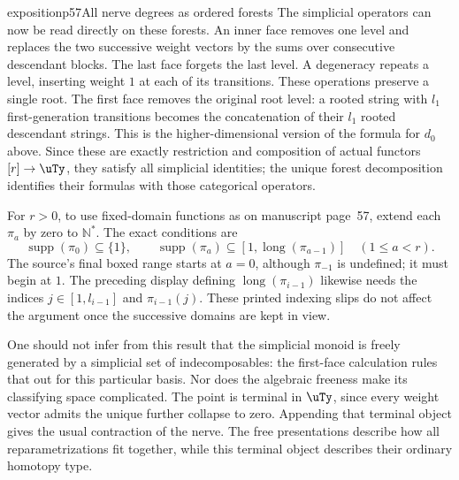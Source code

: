 \begin{dcomment}{exposition}{p57}{All nerve degrees as ordered forests}
The simplicial operators can now be read directly on these forests. An inner face removes one level and replaces the two successive weight vectors by the sums over consecutive descendant blocks. The last face forgets the last level. A degeneracy repeats a level, inserting weight $1$ at each of its transitions. These operations preserve a single root. The first face removes the original root level: a rooted string with $l_1$ first-generation transitions becomes the concatenation of their $l_1$ rooted descendant strings. This is the higher-dimensional version of the formula for $d_0$ above. Since these are exactly restriction and composition of actual functors $[r]\to\uTy$, they satisfy all simplicial identities; the unique forest decomposition identifies their formulas with those categorical operators.

For $r>0$, to use fixed-domain functions as on manuscript page~57, extend each $\pi_a$ by zero to $\mathbb N^*$. The exact conditions are
\[
 \operatorname{supp}(\pi_0)\subseteq\{1\},\qquad
 \operatorname{supp}(\pi_a)\subseteq
       [1,\operatorname{long}(\pi_{a-1})]
       \quad(1\leq a<r).
\]
The source's final boxed range starts at $a=0$, although $\pi_{-1}$ is undefined; it must begin at $1$. The preceding display defining $\operatorname{long}(\pi_{i-1})$ likewise needs the indices $j\in[1,l_{i-1}]$ and $\pi_{i-1}(j)$. These printed indexing slips do not affect the argument once the successive domains are kept in view.

One should not infer from this result that the simplicial monoid is freely generated by a simplicial set of indecomposables: the first-face calculation rules that out for this particular basis. Nor does the algebraic freeness make its classifying space complicated. The point is terminal in $\uTy$, since every weight vector admits the unique further collapse to zero. Appending that terminal object gives the usual contraction of the nerve. The free presentations describe how all reparametrizations fit together, while this terminal object describes their ordinary homotopy type.
\end{dcomment}

